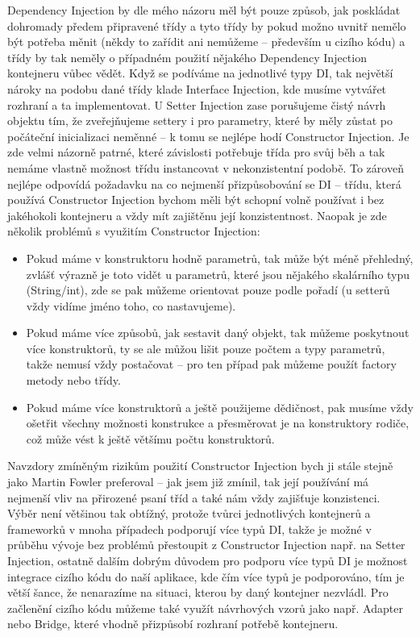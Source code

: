 \documentclass[a4paper,conference]{IEEEtran}
\begin{document}
Dependency Injection by dle mého názoru měl být pouze způsob, jak poskládat dohromady předem připravené třídy a tyto třídy by pokud možno uvnitř nemělo být potřeba měnit (někdy to zařídit ani nemůžeme – především u cizího kódu) a třídy by tak neměly o případném použití nějakého Dependency Injection kontejneru vůbec vědět. Když se podíváme na jednotlivé typy DI, tak největší nároky na podobu dané třídy klade Interface Injection, kde musíme vytvářet rozhraní a ta implementovat. U Setter Injection zase porušujeme čistý návrh objektu tím, že zveřejňujeme settery i pro parametry, které by měly zůstat po počáteční inicializaci neměnné – k tomu se nejlépe hodí Constructor Injection. Je zde velmi názorně patrné, které závislosti potřebuje třída pro svůj běh a tak nemáme vlastně možnost třídu instancovat v nekonzistentní podobě. To zároveň nejlépe odpovídá požadavku na co nejmenší přizpůsobování se DI – třídu, která používá Constructor Injection bychom měli být schopní volně používat i bez jakéhokoli kontejneru a vždy mít zajištěnu její konzistentnost.
Naopak je zde několik problémů s využitím Constructor Injection:
\begin{itemize}
\item Pokud máme v konstruktoru hodně parametrů, tak může být méně přehledný, zvlášť výrazně je toto vidět u parametrů, které jsou nějakého skalárního typu (String/int), zde se pak můžeme orientovat pouze podle pořadí (u setterů vždy vidíme jméno toho, co nastavujeme).
\item Pokud máme více způsobů, jak sestavit daný objekt, tak můžeme poskytnout více konstruktorů, ty se ale můžou lišit pouze počtem a typy parametrů, takže nemusí vždy postačovat – pro ten případ pak můžeme použít factory metody nebo třídy.
\item Pokud máme více konstruktorů a ještě použijeme dědičnost, pak musíme vždy ošetřit všechny možnosti konstrukce a přesměrovat je na konstruktory rodiče, což může vést k ještě většímu počtu konstruktorů.
\end{itemize}
Navzdory zmíněným rizikům použití Constructor Injection bych ji stále stejně jako Martin Fowler preferoval – jak jsem již zmínil, tak její používání má nejmenší vliv na přirozené psaní tříd a také nám vždy zajišťuje konzistenci. Výběr není většinou tak obtížný, protože tvůrci jednotlivých kontejnerů a frameworků v mnoha případech podporují více typů DI, takže je možné v průběhu vývoje bez problémů přestoupit z Constructor Injection např. na Setter Injection, ostatně dalším dobrým důvodem pro podporu více typů DI je možnost integrace cizího kódu do naší aplikace, kde čím více typů je podporováno, tím je větší šance, že nenarazíme na situaci, kterou by daný kontejner nezvládl. Pro začlenění cizího kódu můžeme také využít návrhových vzorů jako např. Adapter nebo Bridge, které vhodně přizpůsobí rozhraní potřebě kontejneru.
\end{document}
